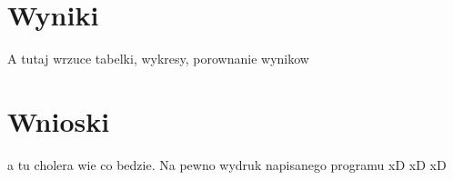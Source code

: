 \documentclass{article}
\begin{document}
	\section{Wyniki}
	A tutaj wrzuce tabelki, wykresy, porownanie wynikow
	\section{Wnioski}
	a tu cholera wie co bedzie. Na pewno wydruk napisanego programu xD xD xD
\end{document}
